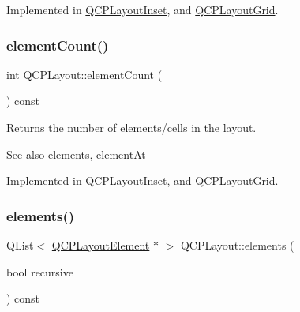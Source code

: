 Implemented in \hyperlink{class_q_c_p_layout_inset_a881ca205605bae9c034733b808f93a02}{Q\+C\+P\+Layout\+Inset}, and \hyperlink{class_q_c_p_layout_grid_a4288f174082555f6bd92021bdedb75dc}{Q\+C\+P\+Layout\+Grid}.

\mbox{\label{class_q_c_p_layout_a39d3e9ef5d9b82ab1885ba1cb9597e56}} 
\subsubsection{\texorpdfstring{element\+Count()}{elementCount()}}
{\footnotesize\ttfamily int Q\+C\+P\+Layout\+::element\+Count (\begin{DoxyParamCaption}{ }\end{DoxyParamCaption}) const\hspace{0.3cm}{\ttfamily [pure virtual]}}

Returns the number of elements/cells in the layout.

\begin{DoxySeeAlso}{See also}
\hyperlink{class_q_c_p_layout_aca129722c019f91d3367046f80abfa77}{elements}, \hyperlink{class_q_c_p_layout_afa73ca7d859f8a3ee5c73c9b353d2a56}{element\+At} 
\end{DoxySeeAlso}


Implemented in \hyperlink{class_q_c_p_layout_inset_a7f5aa4d48a2e844cfe6dd7ed8f0861df}{Q\+C\+P\+Layout\+Inset}, and \hyperlink{class_q_c_p_layout_grid_a9a8942aface780a02445ebcf14c48513}{Q\+C\+P\+Layout\+Grid}.

\mbox{\label{class_q_c_p_layout_aca129722c019f91d3367046f80abfa77}} 
\subsubsection{\texorpdfstring{elements()}{elements()}}
{\footnotesize\ttfamily Q\+List$<$ \hyperlink{class_q_c_p_layout_element}{Q\+C\+P\+Layout\+Element} $\ast$ $>$ Q\+C\+P\+Layout\+::elements (\begin{DoxyParamCaption}\item[{bool}]{recursive }\end{DoxyParamCaption}) const\hspace{0.3cm}{\ttfamily [virtual]}}

